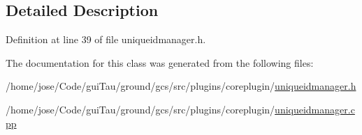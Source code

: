 \subsection{Detailed Description}


Definition at line 39 of file uniqueidmanager.\-h.



The documentation for this class was generated from the following files\-:\begin{DoxyCompactItemize}
\item 
/home/jose/\-Code/gui\-Tau/ground/gcs/src/plugins/coreplugin/\hyperlink{uniqueidmanager_8h}{uniqueidmanager.\-h}\item 
/home/jose/\-Code/gui\-Tau/ground/gcs/src/plugins/coreplugin/\hyperlink{uniqueidmanager_8cpp}{uniqueidmanager.\-cpp}\end{DoxyCompactItemize}
